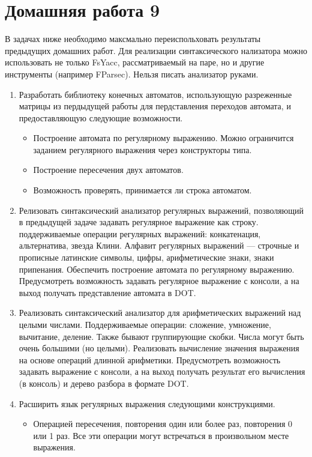 \section{Домашняя работа 9}

В задачах ниже необходимо максмально переиспольховать результаты предыдущих домашних работ. Для реализации синтаксического нализатора можно использовать не только FsYacc, рассматриваемый на паре, но и другие инструменты (например FParsec). Нельзя писать анализатор руками.

\begin{enumerate}
  \item Разработать библиотеку конечных автоматов, использующую разреженные матрицы из пердыдущей работы для пердставления переходов автомата, и предоставляющую следующие возможности.
  \begin{itemize}
    \item Построение автомата по регулярному выражению. Можно ограничится заданием регулярного выражения через конструкторы типа.
    \item Построение пересечения двух автоматов.
    \item Возможность проверять, принимается ли строка автоматом.
  \end{itemize}
  \item Релизовать синтаксический анализатор регулярных выражений, позволяющий в предыдущей задаче задавать регулярное выражение как строку. поддерживаемые операции регулярных выражений: конкатенация, альтернатива, звезда Клини. Алфавит регулярных выражений --- строчные и прописные латинские символы, цифры, арифметические знаки, знаки припенания. Обеспечить построение автомата по регулярному выражению. Предусмотреть возможность задавать регулярное выражение с консоли, а на выход получать представление автомата в DOT.
  \item Реализовать синтаксический анализатор для арифметических выражений над целыми числами. Поддерживаемые операции: сложение, умножение, вычитание, деление. Также бывают группирующие скобки. Числа могут быть очень большими (но целыми). Реализовать вычисление значения выражения на основе операций длинной арифметики. Предусмотреть возможность задавать выражение с консоли, а на выход получать результат его вычисления (в консоль) и дерево разбора в формате DOT.
  \item Расширить язык регулярных выражения следующими конструкциями.
  \begin{itemize}
    \item Операцией пересечения, повторения один или более раз, повторения 0 или 1 раз. Все эти операции могут встречаться в произвольном месте выражения.

\end{itemize}
\end{enumerate}

